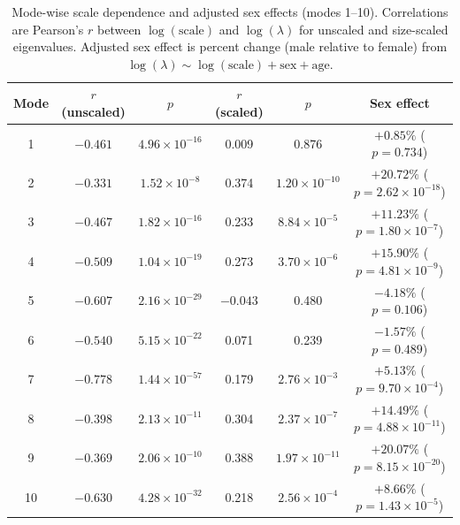 \documentclass[11pt,a4paper]{article}
\begin{document}
\begin{table}[p]
\centering
\caption{Mode-wise scale dependence and adjusted sex effects (modes 1--10). Correlations are Pearson's $r$ between $\log(\mathrm{scale})$ and $\log(\lambda)$ for unscaled and size-scaled eigenvalues. Adjusted sex effect is percent change (male relative to female) from $\log(\lambda) \sim \log(\mathrm{scale}) + \mathrm{sex} + \mathrm{age}$.}
\label{tab:modes}
\begin{tabular}{cccccc}
\toprule
Mode & $r$ (unscaled) & $p$ & $r$ (scaled) & $p$ & Sex effect \\
\midrule
1 & $-0.461$ & $4.96 \times 10^{-16}$ & 0.009 & 0.876 & $+0.85\%$ ($p=0.734$) \\
2 & $-0.331$ & $1.52 \times 10^{-8}$ & 0.374 & $1.20 \times 10^{-10}$ & $+20.72\%$ ($p=2.62 \times 10^{-18}$) \\
3 & $-0.467$ & $1.82 \times 10^{-16}$ & 0.233 & $8.84 \times 10^{-5}$ & $+11.23\%$ ($p=1.80 \times 10^{-7}$) \\
4 & $-0.509$ & $1.04 \times 10^{-19}$ & 0.273 & $3.70 \times 10^{-6}$ & $+15.90\%$ ($p=4.81 \times 10^{-9}$) \\
5 & $-0.607$ & $2.16 \times 10^{-29}$ & $-0.043$ & 0.480 & $-4.18\%$ ($p=0.106$) \\
6 & $-0.540$ & $5.15 \times 10^{-22}$ & 0.071 & 0.239 & $-1.57\%$ ($p=0.489$) \\
7 & $-0.778$ & $1.44 \times 10^{-57}$ & 0.179 & $2.76 \times 10^{-3}$ & $+5.13\%$ ($p=9.70 \times 10^{-4}$) \\
8 & $-0.398$ & $2.13 \times 10^{-11}$ & 0.304 & $2.37 \times 10^{-7}$ & $+14.49\%$ ($p=4.88 \times 10^{-11}$) \\
9 & $-0.369$ & $2.06 \times 10^{-10}$ & 0.388 & $1.97 \times 10^{-11}$ & $+20.07\%$ ($p=8.15 \times 10^{-20}$) \\
10 & $-0.630$ & $4.28 \times 10^{-32}$ & 0.218 & $2.56 \times 10^{-4}$ & $+8.66\%$ ($p=1.43 \times 10^{-5}$) \\
\bottomrule
\end{tabular}
\end{table}
\end{document}
